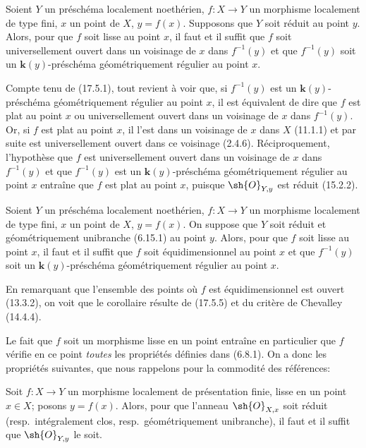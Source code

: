 \begin{proposition}[17.5.5]
\label{IV.17.5.5}
Soient $Y$ un préschéma localement noethérien, $f:X\to Y$ un morphisme localement de type fini, $x$ un point de $X$, $y=f(x)$. Supposons que $Y$ soit \textup{réduit} au point $y$. Alors, pour que $f$ soit lisse au point $x$, il faut et il suffit que $f$ soit universellement ouvert dans un voisinage de $x$ dans $f^{-1}(y)$ et que $f^{-1}(y)$ soit un $\boldsymbol{k}(y)$-préschéma géométriquement régulier au point $x$.
\end{proposition}

Compte tenu de (17.5.1), tout revient à voir que, si $f^{-1}(y)$ est un $\boldsymbol{k}(y)$-préschéma géométriquement régulier au point $x$, il est équivalent de dire que $f$ est plat au point $x$ ou universellement ouvert dans un voisinage de $x$ dans $f^{-1}(y)$. Or, si $f$ est plat au point $x$, il l'est dans un voisinage de $x$ dans $X$ (11.1.1) et par suite est universellement ouvert dans ce voisinage (2.4.6). Réciproquement, l'hypothèse que $f$ est universellement ouvert dans un voisinage de $x$ dans $f^{-1}(y)$ et que $f^{-1}(y)$ est un $\boldsymbol{k}(y)$-préschéma géométriquement régulier au point $x$ entraîne que $f$ est plat au point $x$, puisque $\sh{O}_{Y,y}$ est réduit (15.2.2).

\begin{corollary}[17.5.6]
\label{IV.17.5.6}
Soient $Y$ un préschéma localement noethérien, $f:X\to Y$ un morphisme localement de type fini, $x$ un point de $X$, $y=f(x)$. On suppose que $Y$ soit \textup{réduit} et \textup{géométriquement unibranche (6.15.1)} au point $y$. Alors, pour que $f$ soit lisse au point $x$, il faut et il suffit que $f$ soit équidimensionnel au point $x$ et que $f^{-1}(y)$ soit un $\boldsymbol{k}(y)$-préschéma géométriquement régulier au point $x$.
\end{corollary}

En remarquant que l'ensemble des points où $f$ est équidimensionnel est ouvert (13.3.2), on voit que le corollaire résulte de (17.5.5) et du critère de Chevalley (14.4.4).

Le fait que $f$ soit un morphisme lisse en un point entraîne en particulier que $f$ vérifie
en ce point \emph{toutes} les propriétés définies dans (6.8.1). On a donc les propriétés suivantes, que nous rappelons pour la commodité des références:

\begin{proposition}[17.5.7]
\label{IV.17.5.7}
Soit $f:X\to Y$ un morphisme localement de présentation finie, lisse en un point $x\in X$; posons $y=f(x)$. Alors, pour que l'anneau $\sh{O}_{X,x}$ soit réduit \textup{(resp.}\ intégralement clos, \textup{resp.}\ géométriquement unibranche\textup{)}, il faut et il suffit que $\sh{O}_{Y,y}$ le soit.
\end{proposition}

